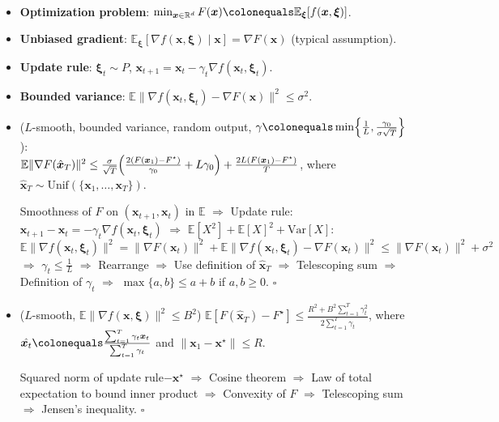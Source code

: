 \documentclass[8pt,a4paper]{extarticle}
\renewcommand{\proof}[1]{\begin{tcolorbox}#1 \hfill $\square$\end{tcolorbox}}
\newcommand{\lft}{\mathopen{}\mathclose\bgroup\left}
\newcommand{\rgt}{\aftergroup\egroup\right}
\newcommand{\E}{\mathbb{E}}
\newcommand{\R}{\mathbb{R}}
\newcommand{\Var}{\mathrm{Var}}
\renewcommand{\vec}[1]{\bm{#1}}
\newenvironment{topic}[1]
{\textbf{\sffamily \colorbox{black}{\rlap{\textbf{\textcolor{white}{#1}}}\hspace{\linewidth}\hspace{-2\fboxsep}}} \\ \vspace{0.2cm}}
{}
\begin{document}
\begin{multicols*}{2}
    \begin{topic}{Stochastic optimization}
        \begin{itemize}
            \item \textbf{Optimization problem}: $\min_{\vec{x} \in \R^d} F(\vec{x}) \colonequals \E_{\vec{\xi}}[f(\vec{x},
                          \vec{\xi})]$.
            \item \textbf{Unbiased gradient}: $\E_{\vec{\xi}}[\nabla f(\vec{x}, \vec{\xi}) \mid \vec{x}] = \nabla F(\vec{x})$ (typical assumption).
            \item \textbf{Update rule}: $\vec{\xi}_t \sim P$, $\vec{x}_{t+1} = \vec{x}_t - \gamma_t \nabla f(\vec{x}_t, \vec{\xi}_t)$.
            \item \textbf{Bounded variance}: $\E \| \nabla f(\vec{x}_t, \vec{\xi}_t) - \nabla F(\vec{x}) \|^2 \leq \sigma^2$.
            \item ($L$-smooth, bounded variance, random output, $\gamma \colonequals \min \lft\{ \frac{1}{L}, \frac{\gamma_0}{\sigma \sqrt{T}} \rgt\}$): \\
                  $\E \| \nabla F(\hat{\vec{x}}_T) \|^2 \leq \frac{\sigma}{\sqrt{T}} \lft( \frac{2(F(\vec{x}_1) - F^\star)}{\gamma_0} + L \gamma_0 \rgt) + \frac{2L(F(\vec{x}_1) - F^\star)}{T}$, where $\hat{\vec{x}}_T \sim \mathrm{Unif}(\{ \vec{x}_1, \ldots, \vec{x}_T \})$.
                  \proof{Smoothness of $F$ on $(\vec{x}_{t+1}, \vec{x}_t)$ in $\E$ $\Rightarrow$ Update rule: $\vec{x}_{t+1} - \vec{x}_t = -\gamma_t \nabla f(\vec{x}_t, \vec{\xi}_t)$ $\Rightarrow$ $\E[X^2] + \E[X]^2 + \Var[X]$: $\E \| \nabla f(\vec{x}_t, \vec{\xi}_t) \|^2 = \| \nabla F(\vec{x}_t) \|^2 + \E \| \nabla f(\vec{x}_t, \vec{\xi}_t) - \nabla F(\vec{x}_t) \|^2 \leq \| \nabla F(\vec{x}_t) \|^2 + \sigma^2$ $\Rightarrow$ $\gamma_t \leq \frac{1}{L}$ $\Rightarrow$ Rearrange $\Rightarrow$ Use definition of $\hat{\vec{x}}_T$ $\Rightarrow$ Telescoping sum $\Rightarrow$ Definition of $\gamma_t$ $\Rightarrow$ $\max \{ a,b \} \leq a + b$ if $a,b \geq 0$.}
            \item ($L$-smooth, $\E \| \nabla f(\vec{x}, \vec{\xi}) \|^2 \leq B^2$)
                  $\E[F(\hat{\vec{x}}_T) - F^\star] \leq \frac{R^2 + B^2 \sum_{t=1}^{T} \gamma_t^2}{2 \sum_{t=1}^{T} \gamma_t}$, where $\hat{\vec{x}_t} \colonequals \frac{\sum_{t=1}^{T} \gamma_t \vec{x}_t}{\sum_{t=1}^{T} \gamma_t}$ and $\| \vec{x}_1 - \vec{x}^\star \| \leq R$.
                  \proof{Squared norm of update rule$-\vec{x}^\star$ $\Rightarrow$ Cosine theorem $\Rightarrow$ Law of total expectation to bound inner product $\Rightarrow$ Convexity of $F$ $\Rightarrow$ Telescoping sum $\Rightarrow$ Jensen's inequality.}

\end{itemize}
\end{topic}
\end{multicols*}
\end{document}

